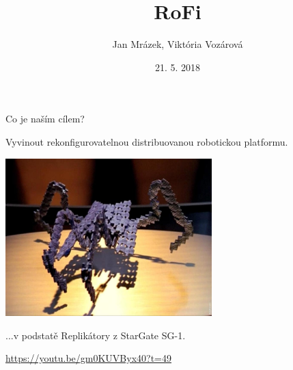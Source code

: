 \documentclass{beamer}
\title[RoFi]{RoFi}
\author{Jan Mrázek, Viktória Vozárová}
\institute{Paradise}
\date{21. 5. 2018}
\begin{document}
\begin{frame}
  \titlepage
\end{frame}

\begin{frame}{Co je naším cílem?}

    Vyvinout rekonfigurovatelnou distribuovanou robotickou platformu.

    \pause

    \begin{center}
    \includegraphics[width=0.6\textwidth]{img/replicator2}

    ...v podstatě Replikátory z StarGate SG-1.

    \url{https://youtu.be/gm0KUVByx40?t=49}
    \end{center}

\end{frame}
\end{document}
